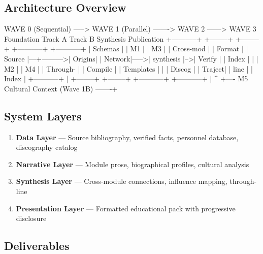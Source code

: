\documentclass[11pt,letterpaper]{article}
\begin{document}
\subsection{Architecture Overview}

\begin{asciibox}
  WAVE 0 (Sequential) -----> WAVE 1 (Parallel) -------> WAVE 2 ------> WAVE 3
  Foundation                  Track A    Track B          Synthesis       Publication
  +-----------+              +--------+ +--------+      +-----------+   +-----------+
  | Schemas   |              | M1     | | M3     |      | Cross-mod |   | Format    |
  | Source    |---+--------->| Origins| | Network|----->| synthesis |-->| Verify    |
  | Index     |   |          | M2     | | M4     |      | Through-  |   | Compile   |
  | Templates |   |          | Discog | | Traject|      | line      |   | Index     |
  +-----------+   |          +--------+ +--------+      +-----------+   +-----------+
                  |                                           ^
                  +---- M5 Cultural Context (Wave 1B) -------+
\end{asciibox}

\subsection{System Layers}

\begin{enumerate}[leftmargin=2em]
\item \textbf{Data Layer} --- Source bibliography, verified facts, personnel database, discography catalog
\item \textbf{Narrative Layer} --- Module prose, biographical profiles, cultural analysis
\item \textbf{Synthesis Layer} --- Cross-module connections, influence mapping, through-line
\item \textbf{Presentation Layer} --- Formatted educational pack with progressive disclosure
\end{enumerate}

\subsection{Deliverables}
\end{document}
